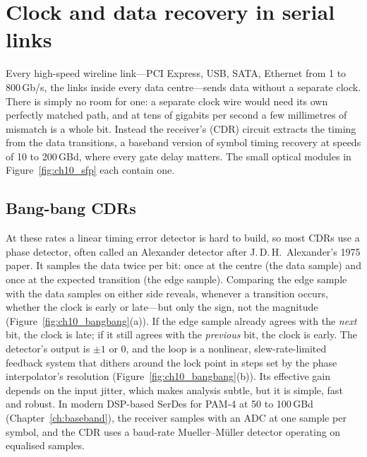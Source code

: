 \section{Clock and data recovery in serial links}
\label{sec:ch10:cdr}

Every high-speed wireline link---PCI Express, USB, SATA, Ethernet from 1 to 800\,Gb/s, the links
inside every data centre---sends data without a separate clock. There is simply no room for one: a
separate clock wire would need its own perfectly matched path, and at tens of gigabits per second a
few millimetres of mismatch is a whole bit. Instead the receiver's 
(CDR) circuit extracts the timing from the data transitions, a baseband version of symbol timing
recovery at speeds of 10 to 200\,GBd, where every gate delay matters. The small optical modules in
Figure~\ref{fig:ch10_sfp} each contain one.


\subsection{Bang-bang CDRs}

At these rates a linear timing error detector is hard to build, so most CDRs use a 
phase detector, often called an Alexander detector after J.\,D.\,H.~Alexander's 1975 paper. It samples
the data twice per bit: once at the centre (the data sample) and once at the expected transition (the
edge sample). Comparing the edge sample with the data samples on either side reveals, whenever a
transition occurs, whether the clock is early or late---but only the sign, not the magnitude
(Figure~\ref{fig:ch10_bangbang}(a)). If the edge sample already agrees with the \emph{next} bit, the
clock is late; if it still agrees with the \emph{previous} bit, the clock is early. The detector's
output is $\pm1$ or 0, and the loop is a nonlinear, slew-rate-limited feedback system that dithers
around the lock point in steps set by the phase interpolator's resolution
(Figure~\ref{fig:ch10_bangbang}(b)). Its effective gain depends on the input jitter, which makes
analysis subtle, but it is simple, fast and robust. In modern DSP-based SerDes for PAM-4 at 50 to
100\,GBd (Chapter~\ref{ch:baseband}), the receiver samples with an ADC at one sample per symbol, and
the CDR uses a baud-rate Mueller--M\"uller detector operating on equalised samples.

